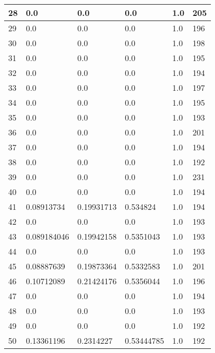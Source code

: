 \begin{longtable}{|l|l|l|l|l|l|}
28 & 0.0 & 0.0 & 0.0 & 1.0 & 205 \\ \hline 
29 & 0.0 & 0.0 & 0.0 & 1.0 & 196 \\ \hline 
30 & 0.0 & 0.0 & 0.0 & 1.0 & 198 \\ \hline 
31 & 0.0 & 0.0 & 0.0 & 1.0 & 195 \\ \hline 
32 & 0.0 & 0.0 & 0.0 & 1.0 & 194 \\ \hline 
33 & 0.0 & 0.0 & 0.0 & 1.0 & 197 \\ \hline 
34 & 0.0 & 0.0 & 0.0 & 1.0 & 195 \\ \hline 
35 & 0.0 & 0.0 & 0.0 & 1.0 & 193 \\ \hline 
36 & 0.0 & 0.0 & 0.0 & 1.0 & 201 \\ \hline 
37 & 0.0 & 0.0 & 0.0 & 1.0 & 194 \\ \hline 
38 & 0.0 & 0.0 & 0.0 & 1.0 & 192 \\ \hline 
39 & 0.0 & 0.0 & 0.0 & 1.0 & 231 \\ \hline 
40 & 0.0 & 0.0 & 0.0 & 1.0 & 194 \\ \hline 
41 & 0.08913734 & 0.19931713 & 0.534824 & 1.0 & 194 \\ \hline 
42 & 0.0 & 0.0 & 0.0 & 1.0 & 193 \\ \hline 
43 & 0.089184046 & 0.19942158 & 0.5351043 & 1.0 & 193 \\ \hline 
44 & 0.0 & 0.0 & 0.0 & 1.0 & 193 \\ \hline 
45 & 0.08887639 & 0.19873364 & 0.5332583 & 1.0 & 201 \\ \hline 
46 & 0.10712089 & 0.21424176 & 0.5356044 & 1.0 & 196 \\ \hline 
47 & 0.0 & 0.0 & 0.0 & 1.0 & 194 \\ \hline 
48 & 0.0 & 0.0 & 0.0 & 1.0 & 193 \\ \hline 
49 & 0.0 & 0.0 & 0.0 & 1.0 & 192 \\ \hline 
50 & 0.13361196 & 0.2314227 & 0.53444785 & 1.0 & 192 \\ \hline 
\end{longtable}